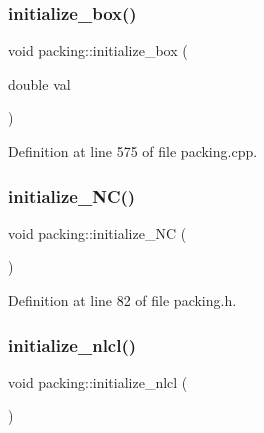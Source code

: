 \mbox{\label{classpacking_a16af9b32d0aa64fe236bc73ca5b98248}} 
\subsubsection{\texorpdfstring{initialize\+\_\+box()}{initialize\_box()}}
{\footnotesize\ttfamily void packing\+::initialize\+\_\+box (\begin{DoxyParamCaption}\item[{double}]{val }\end{DoxyParamCaption})}



Definition at line 575 of file packing.\+cpp.

\mbox{\label{classpacking_a00d1be8bf289c4a8a29fa915c9db13e9}} 
\subsubsection{\texorpdfstring{initialize\+\_\+\+N\+C()}{initialize\_NC()}}
{\footnotesize\ttfamily void packing\+::initialize\+\_\+\+NC (\begin{DoxyParamCaption}{ }\end{DoxyParamCaption})\hspace{0.3cm}{\ttfamily [inline]}}



Definition at line 82 of file packing.\+h.

\mbox{\label{classpacking_af1514931993a8ea4fd14ff53f7d38b70}} 
\subsubsection{\texorpdfstring{initialize\+\_\+nlcl()}{initialize\_nlcl()}}
{\footnotesize\ttfamily void packing\+::initialize\+\_\+nlcl (\begin{DoxyParamCaption}{ }\end{DoxyParamCaption})}



